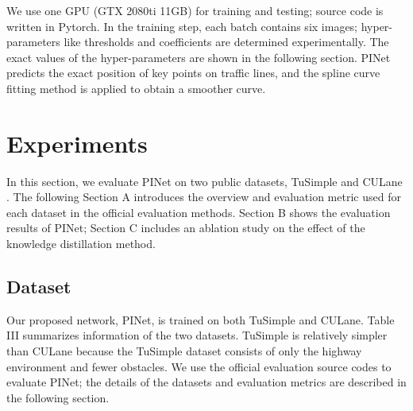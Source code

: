 \documentclass[journal]{IEEEtran}
\begin{document}
We use one GPU (GTX 2080ti 11GB) for training and testing; source code is written in Pytorch. In the training step, each batch contains six images; hyper-parameters like thresholds and coefficients are determined experimentally. The exact values of the hyper-parameters are shown in the following section. PINet predicts the exact position of key points on traffic lines, and the spline curve fitting method is applied to obtain a smoother curve.






\section{Experiments}
In this section, we evaluate PINet on two public datasets, TuSimple \cite{tuSimple} and CULane \cite{pan2018spatial}. The following Section A introduces the overview and evaluation metric used for each dataset in the official evaluation methods. Section B shows the evaluation results of PINet; Section C includes an ablation study on the effect of the knowledge distillation method.

\subsection{Dataset}
Our proposed network, PINet, is trained on both TuSimple and CULane. Table III summarizes information of the two datasets. TuSimple is relatively simpler than CULane because the TuSimple dataset consists of only the highway environment and fewer obstacles. We use the official evaluation source codes to evaluate PINet; the details of the datasets and evaluation metrics are described in the following section.
\end{document}
